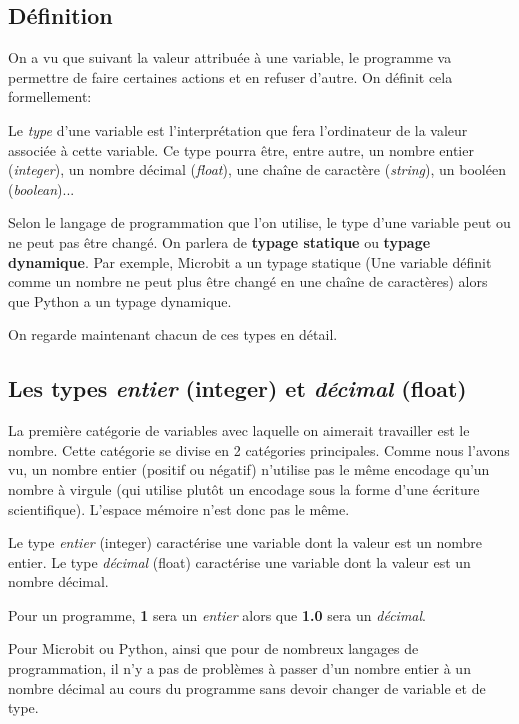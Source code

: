 \documentclass[11pt, a4paper]{book}
\begin{document}
\subsection{Définition}

On a vu que suivant la valeur attribuée à une variable, le programme va permettre de faire certaines actions et en refuser d'autre. On définit cela formellement:

\begin{defi}
Le {\it type} d'une variable est l'interprétation que fera l'ordinateur de la valeur associée à cette variable. Ce type pourra être, entre autre, un nombre entier ({\it integer}), un nombre décimal ({\it float}), une chaîne de caractère ({\it string}), un booléen ({\it boolean})...
\end{defi}

Selon le langage de programmation que l'on utilise, le type d'une variable peut ou ne peut pas être changé. On parlera de {\bf typage statique} ou {\bf typage dynamique}. Par exemple, Microbit a un typage statique (Une variable définit comme un nombre ne peut plus être changé en une chaîne de caractères) alors que Python a un typage dynamique. 

On regarde maintenant chacun de ces types en détail. 



\subsection{Les types {\it entier} (integer) et {\it décimal} (float)}

La première catégorie de variables avec laquelle on aimerait travailler est le nombre. Cette catégorie se divise en 2 catégories principales. Comme nous l'avons vu, un nombre entier (positif ou négatif) n'utilise pas le même encodage qu'un nombre à virgule (qui utilise plutôt un encodage sous la forme d'une écriture scientifique). L'espace mémoire n'est donc pas le même. 

\begin{defi}
Le type {\it entier} (integer) caractérise une variable dont la valeur est un nombre entier. Le type {\it décimal} (float) caractérise une variable dont la valeur est un nombre décimal.
\end{defi}

Pour un programme, {\bf 1} sera un {\it entier} alors que {\bf 1.0} sera un {\it décimal}.

Pour Microbit ou Python, ainsi que pour de nombreux langages de programmation, il n'y a pas de problèmes à passer d'un nombre entier à un nombre décimal au cours du programme sans devoir changer de variable et de type.
\end{document}
